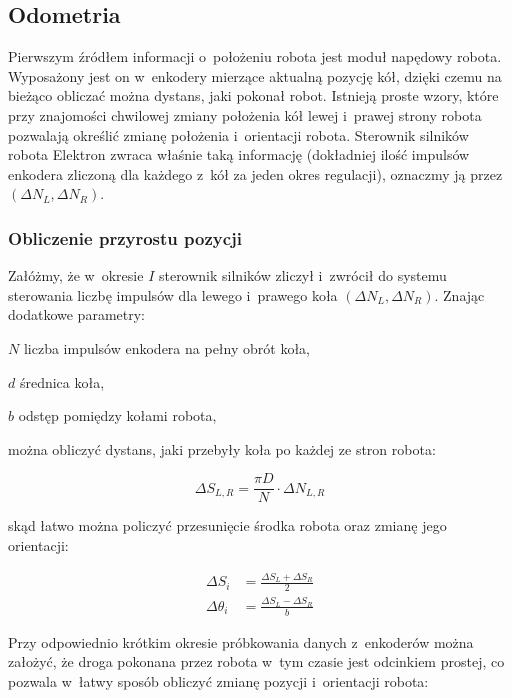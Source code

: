 \subsection{Odometria}

Pierwszym źródłem informacji o~położeniu robota jest moduł napędowy robota.
Wyposażony jest on w~enkodery mierzące aktualną pozycję kół, dzięki czemu na
bieżąco obliczać można dystans, jaki pokonał robot. Istnieją proste wzory, które
przy znajomości chwilowej zmiany położenia kół lewej i~prawej strony robota
pozwalają określić zmianę położenia i~orientacji robota. Sterownik silników
robota Elektron zwraca właśnie taką informację (dokładniej ilość impulsów
enkodera zliczoną dla każdego z~kół za jeden okres regulacji), oznaczmy ją przez
$(\Delta N_L, \Delta N_R)$.

\subsubsection{Obliczenie przyrostu pozycji}

Załóżmy, że w~okresie $I$ sterownik silników zliczył i~zwrócił do systemu
sterowania liczbę impulsów dla lewego i~prawego koła $(\Delta N_L, \Delta N_R)$.
Znając dodatkowe parametry:


\begin{mydescription}{5pt}
\item[$N$] liczba impulsów enkodera na pełny obrót koła,
\item[$d$] średnica koła,
\item[$b$] odstęp pomiędzy kołami robota,
\end{mydescription}

można obliczyć dystans, jaki przebyły koła po każdej ze stron robota:

\[
\Delta S_{L,R} = \frac{\pi D}{N} \cdot \Delta N_{L,R}
\]

skąd łatwo można policzyć przesunięcie środka robota oraz zmianę jego
orientacji:

\begin{align*}
\Delta S_i &= \frac{\Delta S_L + \Delta S_R}{2} \\
\Delta \theta_i &= \frac{\Delta S_L - \Delta S_R}{b}
\end{align*}

Przy odpowiednio krótkim okresie próbkowania danych z~enkoderów można założyć,
że droga pokonana przez robota w~tym czasie jest odcinkiem prostej, co pozwala 
w~łatwy sposób obliczyć zmianę pozycji i~orientacji robota:

